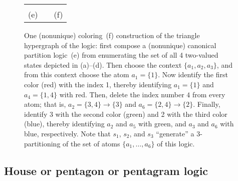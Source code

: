 \documentclass[%
12pt,
prereprint,
showpacs,
showkeys,
preprintnumbers,
amsmath,amssymb,
aps,
pra,
longbibliography,
notitlepage
]{revtex4-1}
\theoremstyle{definition}
\begin{document}
\begin{figure}
\begin{center}
\begin{tabular}{ c c c}
\begin{tikzpicture}  [scale=0.8]
				\end{tikzpicture}
				\\
				(e)&&(f)
			\end{tabular}
		\end{center}
		\caption{\label{2020-f-chroma-triangle3}
			One (nonunique) coloring~(f) construction of
			the triangle hypergraph of the logic: first compose a (nonunique)
			canonical partition logic~(e) from enumerating the set of all 4 two-valued states depicted in (a)--(d).
			Then choose the context $\{a_1,a_2,a_3\}$, and from this context choose the atom $a_1=\{1\}$.
			Now identify the first color (red) with the index 1, thereby identifying $a_1=\{1\}$ and $a_4=\{1,4\}$ with red.
			Then, delete the index number $4$ from every atom; that is, $a_2=\{3,4\}\rightarrow \{3\}$ and $a_6=\{2,4\}\rightarrow \{2\}$.
			Finally, identify 3 with the second color (green) and 2 with the third color (blue),
			thereby identifying $a_2$ and $a_5$ with green, and $a_3$ and $a_6$ with blue, respectively.
			Note that $s_1$, $s_2$, and $s_3$ ``generate'' a 3-partitioning of the set of atoms $\{a_1,\ldots ,a_6\}$ of this logic.
		}
	\end{figure}
	
	\subsection{House or pentagon or pentagram logic}
	
\end{document}
